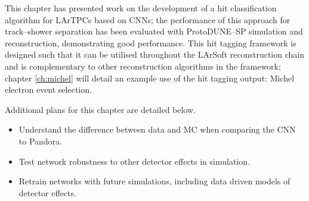 This chapter has presented work on the development of a hit classification
algorithm for LArTPCs based on CNNs; the performance of this approach for
track--shower separation has been evaluated with ProtoDUNE--SP simulation and
reconstruction, demonstrating good performance. This hit tagging framework is
designed such that it can be utilised throughout the LArSoft reconstruction
chain and is complementary to other reconstruction algorithms in the framework;
chapter \ref{ch:michel} will detail an example use of the hit tagging output:
Michel electron event selection.

\noindent Additional plans for this chapter are detailed below.
\begin{itemize}[noitemsep,nolistsep]
	\item Understand the difference between data and MC when comparing the
		CNN to Pandora.
	\item Test network robustness to other detector effects in simulation. 
	\item Retrain networks with future simulations, including data
		driven models of detector effects.
\end{itemize}

